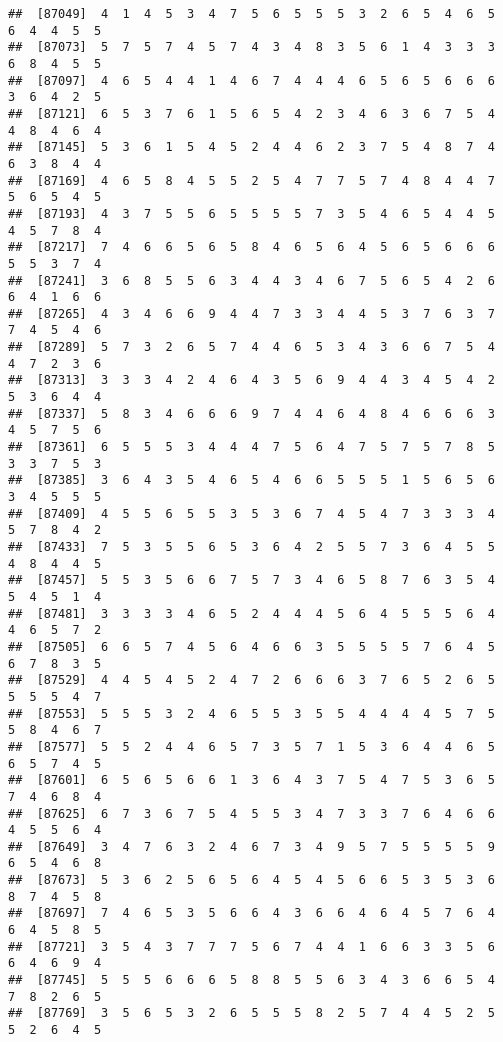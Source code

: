 \documentclass[
]{book}
\begin{document}
\begin{verbatim}
##  [87049]  4  1  4  5  3  4  7  5  6  5  5  5  3  2  6  5  4  6  5  6  4  4  5  5
##  [87073]  5  7  5  7  4  5  7  4  3  4  8  3  5  6  1  4  3  3  3  6  8  4  5  5
##  [87097]  4  6  5  4  4  1  4  6  7  4  4  4  6  5  6  5  6  6  6  3  6  4  2  5
##  [87121]  6  5  3  7  6  1  5  6  5  4  2  3  4  6  3  6  7  5  4  4  8  4  6  4
##  [87145]  5  3  6  1  5  4  5  2  4  4  6  2  3  7  5  4  8  7  4  6  3  8  4  4
##  [87169]  4  6  5  8  4  5  5  2  5  4  7  7  5  7  4  8  4  4  7  5  6  5  4  5
##  [87193]  4  3  7  5  5  6  5  5  5  5  7  3  5  4  6  5  4  4  5  4  5  7  8  4
##  [87217]  7  4  6  6  5  6  5  8  4  6  5  6  4  5  6  5  6  6  6  5  5  3  7  4
##  [87241]  3  6  8  5  5  6  3  4  4  3  4  6  7  5  6  5  4  2  6  6  4  1  6  6
##  [87265]  4  3  4  6  6  9  4  4  7  3  3  4  4  5  3  7  6  3  7  7  4  5  4  6
##  [87289]  5  7  3  2  6  5  7  4  4  6  5  3  4  3  6  6  7  5  4  4  7  2  3  6
##  [87313]  3  3  3  4  2  4  6  4  3  5  6  9  4  4  3  4  5  4  2  5  3  6  4  4
##  [87337]  5  8  3  4  6  6  6  9  7  4  4  6  4  8  4  6  6  6  3  4  5  7  5  6
##  [87361]  6  5  5  5  3  4  4  4  7  5  6  4  7  5  7  5  7  8  5  3  3  7  5  3
##  [87385]  3  6  4  3  5  4  6  5  4  6  6  5  5  5  1  5  6  5  6  3  4  5  5  5
##  [87409]  4  5  5  6  5  5  3  5  3  6  7  4  5  4  7  3  3  3  4  5  7  8  4  2
##  [87433]  7  5  3  5  5  6  5  3  6  4  2  5  5  7  3  6  4  5  5  4  8  4  4  5
##  [87457]  5  5  3  5  6  6  7  5  7  3  4  6  5  8  7  6  3  5  4  5  4  5  1  4
##  [87481]  3  3  3  3  4  6  5  2  4  4  4  5  6  4  5  5  5  6  4  4  6  5  7  2
##  [87505]  6  6  5  7  4  5  6  4  6  6  3  5  5  5  5  7  6  4  5  6  7  8  3  5
##  [87529]  4  4  5  4  5  2  4  7  2  6  6  6  3  7  6  5  2  6  5  5  5  5  4  7
##  [87553]  5  5  5  3  2  4  6  5  5  3  5  5  4  4  4  4  5  7  5  5  8  4  6  7
##  [87577]  5  5  2  4  4  6  5  7  3  5  7  1  5  3  6  4  4  6  5  6  5  7  4  5
##  [87601]  6  5  6  5  6  6  1  3  6  4  3  7  5  4  7  5  3  6  5  7  4  6  8  4
##  [87625]  6  7  3  6  7  5  4  5  5  3  4  7  3  3  7  6  4  6  6  4  5  5  6  4
##  [87649]  3  4  7  6  3  2  4  6  7  3  4  9  5  7  5  5  5  5  9  6  5  4  6  8
##  [87673]  5  3  6  2  5  6  5  6  4  5  4  5  6  6  5  3  5  3  6  8  7  4  5  8
##  [87697]  7  4  6  5  3  5  6  6  4  3  6  6  4  6  4  5  7  6  4  6  4  5  8  5
##  [87721]  3  5  4  3  7  7  7  5  6  7  4  4  1  6  6  3  3  5  6  6  4  6  9  4
##  [87745]  5  5  5  6  6  6  5  8  8  5  5  6  3  4  3  6  6  5  4  7  8  2  6  5
##  [87769]  3  5  6  5  3  2  6  5  5  5  8  2  5  7  4  4  5  2  5  5  2  6  4  5

\end{verbatim}
\end{document}
